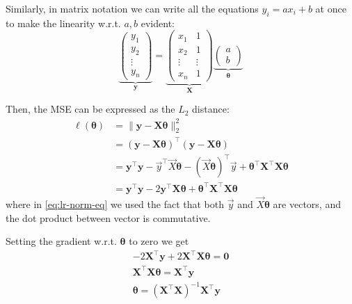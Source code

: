 Similarly, in matrix notation we can write all the equations $y_i = ax_i + b$ at once to make the linearity w.r.t. $a,b$ evident:
\begin{equation}
	\underbrace{\begin{pmatrix} y_1  \\ y_2  \\ \vdots  \\ y_n \end{pmatrix}}_\mathbf{y} = \underbrace{\begin{pmatrix} x_1 & 1 \\ x_2 & 1 \\ \vdots & \vdots \\ x_n & 1 \end{pmatrix}}_\mathbf{X}  \underbrace{\begin{pmatrix} a \\ b \end{pmatrix}}_{\bm{\theta}}
\end{equation}

Then, the MSE can be expressed as the $L_2$ distance:
\begin{align}
	\ell(\bm{\theta}) & = \| \mathbf{y} - \mathbf{X} \bm{\theta} \|_2^2 \\
	& = \left( \mathbf{y} - \mathbf{X} \bm{\theta} \right)^\top \left( \mathbf{y} - \mathbf{X} \bm{\theta} \right) \\
	& = \mathbf{y}^\top\mathbf{y} - \vec{y}^\top \vec{X}\bm{\theta} - (\vec{X}\bm{\theta})^\top \vec{y}  +  \bm{\theta}^\top\mathbf{X}^\top \mathbf{X}\bm{\theta}  \\
    & = \mathbf{y}^\top\mathbf{y} -2 \mathbf{y}^\top \mathbf{X}\bm{\theta} + \bm{\theta}^\top\mathbf{X}^\top \mathbf{X}\bm{\theta} \label{eq:lr-norm-eq} 
\end{align}
where in \cref{eq:lr-norm-eq} we used the fact that both $\vec{y}$ and $\vec{X}\bm{\theta}$ are vectors, and the dot product between vector is commutative.

Setting the gradient w.r.t. $\bm{\theta}$ to zero we get
\begin{align}
	-2 \mathbf{X}^\top \mathbf{y}  + 2 \mathbf{X}^\top \mathbf{X}\bm{\theta} = \mathbf{0} \\
	\mathbf{X}^\top \mathbf{X}  \bm{\theta} =  \mathbf{X}^\top\mathbf{y} \\
	\bm{\theta} = (\mathbf{X}^\top \mathbf{X})^{-1} \mathbf{X}^\top\mathbf{y}
\end{align}

